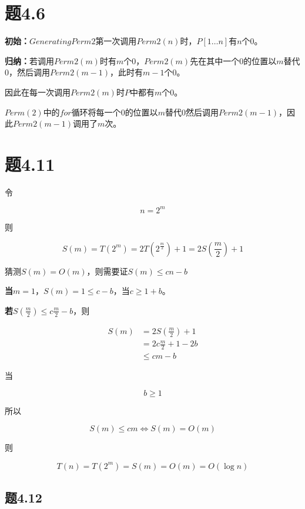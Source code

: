 \documentclass[a4paper,twoside]{article}
\begin{document}
\begin{spacing}{1.2}
\section{题4.6}

\textbf{初始：}$GeneratingPerm2$第一次调用$Perm2(n)$时，$P[1\dots n]$有$n$个$0$。

\textbf{归纳：}若调用$Perm2(m)$时有$m$个$0$，$Perm2(m)$先在其中一个$0$的位置以$m$替代$0$，然后调用$Perm2(m-1)$，此时有$m-1$个$0$。

因此在每一次调用$Perm2(m)$时$P$中都有$m$个$0$。

$Perm(2)$中的$for$循环将每一个$0$的位置以$m$替代$0$然后调用$Perm2(m-1)$，因此$Perm2(m-1)$调用了$m$次。

\section{题4.11}

令

$$
n=2^m
$$

则

$$
S(m)=T(2^m)=2T(2^{\frac{m}{2}})+1=2S(\frac{m}{2})+1
$$

猜测$S(m)=O(m)$，则需要证$S(m)\le cn-b$

\textbf{当$m=1$}，$S(m)=1\le c-b$，当$c \ge 1+b$。

\textbf{若$S(\frac{m}{2})\le c\frac{m}{2}-b$}，则

\begin{align*}
	S(m)&=2S(\frac{m}{2})+1 \\
	&=2c \frac{m}{2}+1-2b \\
	& \le cm-b
\end{align*}

当

$$
b \ge 1
$$

所以

$$
S(m) \le cm \iff S(m)=O(m)
$$

则

$$
T(n)=T(2^m)=S(m)=O(m)=O(\log n)
$$

\subsection{题4.12}


\end{spacing}
\end{document}
